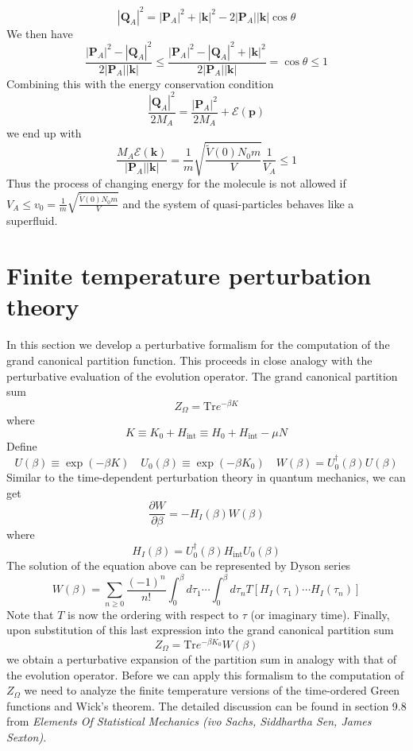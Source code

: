 \[|\bm{Q}_A|^2 = |\bm{P}_A|^2 + |\bm{k}|^2 - 2|\bm{P}_A||\bm{k}|\cos\theta\]
We then have
\[\frac{|\bm{P}_A|^2-|\bm{Q}_A|^2}{2|\bm{P}_A| |\bm{k}|} \leq \frac{|\bm{P}_A|^2-|\bm{Q}_A|^2 + |\bm{k}|^2}{2|\bm{P}_A| |\bm{k}|} = \cos\theta \leq 1\]
Combining this with the energy conservation condition
\[\frac{|\bm{Q}_A|^2}{2M_A} = \frac{|\bm{P}_A|^2}{2M_A} + \mathcal{E}(\bm{p})\]
we end up with
\[\frac{M_A\mathcal{E}(\bm{k})}{|\bm{P}_A| |\bm{k}|} = \frac{1}{m}\sqrt{\frac{\tilde{V}(0)N_0m}{V}} \frac{1}{V_A} \leq 1\]
Thus the process of changing energy for the molecule is not allowed if $V_A \leq v_0 = \frac{1}{m}\sqrt{\frac{\tilde{V}(0)N_0m}{V}} $ and the system of quasi-particles behaves like a superfluid.

\section{Finite temperature perturbation theory}
In this section we develop a perturbative formalism for the computation of the grand canonical partition function. This proceeds in close analogy with the perturbative evaluation of the evolution operator. The grand canonical partition sum 
\[Z_{\Omega} = \mathrm{Tr}e^{-\beta K}\]
where
\[K \equiv K_0 + H_{\mathrm{int}} \equiv H_0 + H_{\mathrm{int}} -\mu N\]
Define
\[U(\beta) \equiv \exp(-\beta K) \quad U_0(\beta) \equiv \exp(-\beta K_0) \quad W(\beta) = U_0^{\dagger}(\beta)U(\beta)\]
Similar to the time-dependent perturbation theory in quantum mechanics, we can get
\[\frac{\partial W}{\partial \beta} = -H_I(\beta)W(\beta)\]
where
\[H_I(\beta) = U_0^{\dagger}(\beta)H_{\mathrm{int}}U_0(\beta)\]
The solution of the equation above can be represented by Dyson series
\[W(\beta) = \sum_{n \geq 0} \frac{(-1)^n}{n!} \int_0^{\beta}d\tau_1 \cdots \int_0^{\beta} d\tau_n T[H_I(\tau_1)\cdots H_I(\tau_n)]\]
Note that $T$ is now the ordering with respect to $\tau$ (or imaginary time). Finally, upon substitution of this last expression into the grand canonical partition sum
\[Z_{\Omega} = \mathrm{Tr} e^{-\beta K_0}W(\beta)\]
we obtain a perturbative expansion of the partition sum in analogy with that of the evolution operator. Before we can apply this formalism to the computation of $Z_{\Omega}$ we need to analyze the finite temperature versions of the time-ordered Green functions and Wick's theorem. The detailed discussion can be found in section 9.8 from \emph{Elements Of Statistical Mechanics (ivo Sachs, Siddhartha Sen, James Sexton)}.

